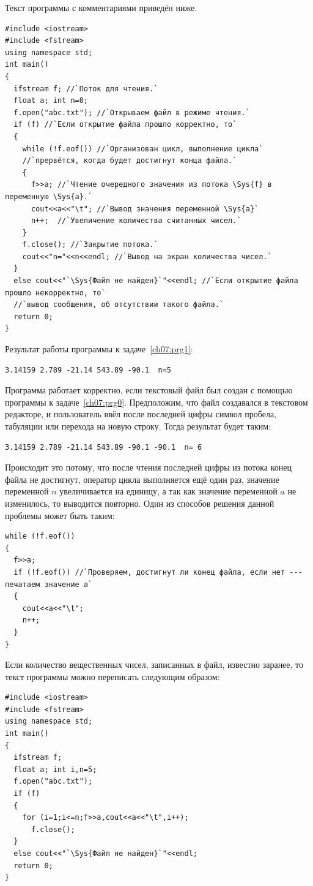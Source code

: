 Текст программы с комментариями приведён ниже.
\begin{lstlisting}
#include <iostream>
#include <fstream>
using namespace std;
int main()
{
  ifstream f; //`Поток для чтения.`
  float a; int n=0;
  f.open("abc.txt"); //`Открываем файл в режиме чтения.`
  if (f) //`Если открытие файла	прошло корректно, то`
  {
    while (!f.eof()) //`Организован цикл, выполнение цикла`
    //`прервётся, когда будет достигнут конца файла.`
    {
      f>>a; //`Чтение очередного значения из потока \Sys{f} в переменную \Sys{a}.`
      cout<<a<<"\t"; //`Вывод значения переменной \Sys{a}` 
      n++;  //`Увеличение количества считанных чисел.`
    }
    f.close(); //`Закрытие потока.`
    cout<<"n="<<n<<endl; //`Вывод на экран количества чисел.`
  }
  else cout<<"`\Sys{Файл не найден}`"<<endl; //`Если открытие файла прошло некорректно, то`
  //`вывод сообщения, об отсутствии такого файла.`
  return 0;
}
\end{lstlisting}

Результат работы программы к задаче~\ref{ch07:prg1}:
\begin{verbatim}
3.14159 2.789 -21.14 543.89 -90.1  n=5
\end{verbatim}

Программа работает корректно, если текстовый файл  был создан с помощью 
программы к задаче~\ref{ch07:prg0}. Предположим, что файл создавался в текстовом редакторе, 
и пользователь ввёл после последней цифры символ пробела, табуляции или перехода на новую строку. 
Тогда результат будет таким:
\begin{verbatim}
3.14159 2.789 -21.14 543.89 -90.1 -90.1  n= 6
\end{verbatim}

Происходит это потому, что после чтения последней цифры из потока конец файла не достигнут, оператор 
цикла выполняется ещё один раз, значение переменной $n$ увеличивается на единицу, а так как значение 
переменной $a$ не изменилось, то выводится повторно. Один из способов решения данной проблемы может быть таким:
\begin{lstlisting}
while (!f.eof())
{
  f>>a;
  if (!f.eof()) //`Проверяем, достигнут ли конец файла, если нет --- печатаем значение a`
  {
    cout<<a<<"\t";
    n++;
  }
}
\end{lstlisting}

Если количество вещественных чисел, записанных в файл, известно заранее, то текст программы можно переписать следующим
образом:

\begin{lstlisting}
#include <iostream>
#include <fstream>
using namespace std;
int main()
{
  ifstream f;
  float a; int i,n=5;
  f.open("abc.txt");
  if (f)
  {
    for (i=1;i<=n;f>>a,cout<<a<<"\t",i++);
      f.close();
  }
  else cout<<"`\Sys{Файл не найден}`"<<endl;
  return 0;
}
\end{lstlisting}

